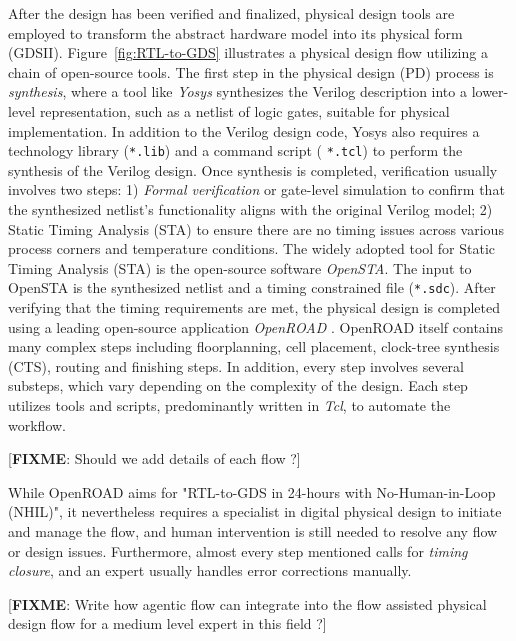 After the design has been verified and finalized, physical design tools are employed to transform the abstract hardware model into its physical form (GDSII). Figure~\ref{fig:RTL-to-GDS} illustrates a physical design flow utilizing a chain of open-source tools. The first step in the physical design (PD) process is \textit{synthesis}, where a tool like \textit{Yosys} synthesizes the Verilog description into a lower-level representation, such as a netlist of logic gates, suitable for physical implementation. In addition to the Verilog design code, Yosys also requires a technology library (\texttt{*.lib}) and a command script (	\texttt{*.tcl}) to perform the synthesis of the Verilog design. Once synthesis is completed, verification usually involves two steps: 1) 	\textit{Formal verification} or gate-level simulation to confirm that the synthesized netlist's functionality aligns with the original Verilog model; 2) Static Timing Analysis (STA) to ensure there are no timing issues across various process corners and temperature conditions. 
The widely adopted tool for Static Timing Analysis (STA) is the open-source software \textit{OpenSTA}. The input to OpenSTA is the synthesized netlist and a timing constrained file (\texttt{*.sdc}). 
After verifying that the timing requirements are met, the physical design is completed using a leading open-source application \textit{OpenROAD} \cite{ajayi2019toward}.
OpenROAD itself contains many complex steps including floorplanning, cell placement, clock-tree synthesis (CTS), routing and finishing steps. In addition, every step involves several substeps, which vary depending on the complexity of the design. Each step utilizes tools and scripts, predominantly written in \textit{Tcl}, to automate the workflow. 

[\textbf{FIXME}: Should we add details of each flow ?]

While OpenROAD aims for "RTL-to-GDS in 24-hours with No-Human-in-Loop (NHIL)", it nevertheless requires a specialist in digital physical design to initiate and manage the flow, and human intervention is still needed to resolve any flow or design issues.
Furthermore, almost every step mentioned calls for \textit{ timing closure}, and an expert usually handles error corrections manually.

[\textbf{FIXME}: Write how agentic flow can integrate into the flow assisted physical design flow for a medium level expert in this field ?]

